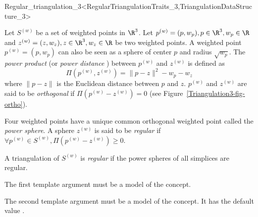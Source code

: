 

\begin{ccRefClass}{Regular_triangulation_3<RegularTriangulationTraits_3,TriangulationDataStructure_3>}

\ccDefinition
  Let ${S}^{(w)}$ be a set of weighted points in $\R^3$. Let
${p}^{(w)}=(p,w_p), p\in\R^3, w_p\in\R$ and 
${z}^{(w)}=(z,w_z), z\in\R^3, w_z\in\R$ be two weighted points. 
A weighted point
${p}^{(w)}=(p,w_p)$ can also be seen as a sphere of center $p$ and
radius $\sqrt{w_p}$. 
The \textit{power product} (or  \textit{power distance} ) 
between ${p}^{(w)}$ and ${z}^{(w)}$ is
defined as 
\[\Pi({p}^{(w)},{z}^{(w)}) = {\|{p-z}\|^2-w_p-w_z}\]
where $\|{p-z}\|$ is the Euclidean distance between $p$ and $z$. 
 ${p}^{(w)}$ and ${z}^{(w)}$
are said to be \textit{orthogonal} if $\Pi{({p}^{(w)}-{z}^{(w)})}
= 0$ (see Figure~\ref{Triangulation3-fig-ortho}).

Four weighted points have a unique common orthogonal weighted point called
the \textit{power sphere}. A sphere ${z}^{(w)}$ is said to be
\textit{regular} if $\forall {p}^{(w)}\in{S}^{(w)},
\Pi{({p}^{(w)}-{z}^{(w)})}\geq 0$.

A triangulation of ${S}^{(w)}$ is \textit{regular} if the power spheres
of all simplices are regular. 


\ccParameters

The first template argument must be a model of the
 concept.

The second template argument must be a model of the
 concept.
It has the default value .



\ccTypes
{}


\end{ccRefClass}
